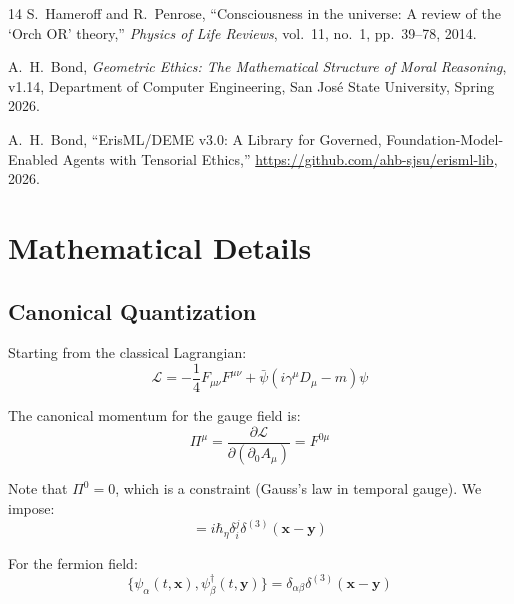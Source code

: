 \documentclass[12pt]{article}
\begin{document}
\begin{thebibliography}{14}
S.~Hameroff and R.~Penrose, ``Consciousness in the universe: A review of the `Orch OR' theory,'' \emph{Physics of Life Reviews}, vol.~11, no.~1, pp.~39--78, 2014.

A.~H.~Bond, \emph{Geometric Ethics: The Mathematical Structure of Moral Reasoning}, v1.14, Department of Computer Engineering, San Jos\'e State University, Spring 2026.

A.~H.~Bond, ``ErisML/DEME v3.0: A Library for Governed, Foundation-Model-Enabled Agents with Tensorial Ethics,'' \url{https://github.com/ahb-sjsu/erisml-lib}, 2026.

\end{thebibliography}

\appendix

\section{Mathematical Details}

\subsection{Canonical Quantization}

Starting from the classical Lagrangian:
\begin{equation}
    \mathcal{L} = -\frac{1}{4} F_{\mu\nu} F^{\mu\nu} + \bar{\psi}(i\gamma^\mu D_\mu - m)\psi
\end{equation}

The canonical momentum for the gauge field is:
\begin{equation}
    \Pi^\mu = \frac{\partial \mathcal{L}}{\partial(\partial_0 A_\mu)} = F^{0\mu}
\end{equation}

Note that $\Pi^0 = 0$, which is a constraint (Gauss's law in temporal gauge). We impose:
\begin{equation}
    [A_i(t, \mathbf{x}), \Pi^j(t, \mathbf{y})] = i\hbar_\eta \delta_i^j \delta^{(3)}(\mathbf{x} - \mathbf{y})
\end{equation}

For the fermion field:
\begin{equation}
    \{\psi_\alpha(t, \mathbf{x}), \psi_\beta^\dagger(t, \mathbf{y})\} = \delta_{\alpha\beta} \delta^{(3)}(\mathbf{x} - \mathbf{y})
\end{equation}
\end{document}
